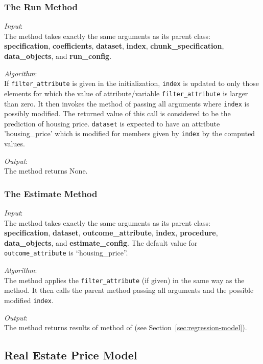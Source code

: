 \subsubsection{The Run Method}
%
{\it Input}:\\[1mm]
The  method takes exactly the same arguments as its parent
class:\\
{\bf specification}, {\bf coefficients}, {\bf dataset}, {\bf index}, {\bf
  chunk_specification}, {\bf data_objects}, and {\bf run_config}.

{\it Algorithm}:\\[1mm]
If \verb|filter_attribute| is given in the initialization, \verb|index| is
updated to only those elements for which the value of
attribute/variable \verb|filter_attribute| is
larger than zero. It then invokes the  method of
 passing all arguments where
\verb|index| is possibly modified. The returned value of this call
is considered to be the prediction of housing price. \verb|dataset| is expected to have 
an attribute 'housing_price' which is modified for members given by \verb|index| by the computed values.

{\it Output}:\\[1mm]
The method returns None.

\subsubsection{The Estimate Method}
{\it Input}:\\[1mm]
The  method takes exactly the same arguments as its parent
class: \\
{\bf specification}, {\bf dataset}, {\bf outcome_attribute}, {\bf index}, {\bf
  procedure}, {\bf data_objects}, and {\bf estimate_config}. The default value 
for \verb|outcome_attribute| is ``housing_price''.

{\it Algorithm}:\\[1mm]
The method applies the \verb|filter_attribute| (if given) in the same way as the
 method. It then calls the parent method 
passing all arguments and the possible modified \verb|index|.

{\it Output}:\\[1mm]
The method returns results of  method of
 (see Section~\ref{sec:regression-model}).

%
\subsection{Real Estate Price Model}
%
\label{sec:real-estate-price-model}

